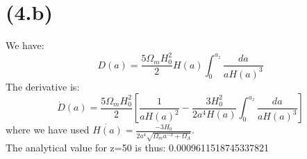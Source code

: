 \section{(4.b)}
We have:
\begin{equation}
    D(a)= \frac{5\Omega_{m}H_{0}^{2}}{2}H(a)\int_{0}^{a_{z}}\frac{da}{aH(a)^{3}}
\end{equation}
The derivative is:
\begin{equation}
    \dot D(a)= \frac{5\Omega_{m}H_{0}^{2}}{2}[\frac{1}{aH(a)^2}-\frac{3H_{0}^{2}}{2a^{4}H(a)}\int_{0}^{a_{z}}\frac{da}{aH(a)^{3}}]
\end{equation}
where we have used $\dot{H(a)} =\frac{-3H_{0}}{2a^{4}\sqrt{\Omega_{m}a^{-3} + \Omega_\Lambda}}$.\\
The analytical value for z=50 is thus: 0.0009611518745337821

